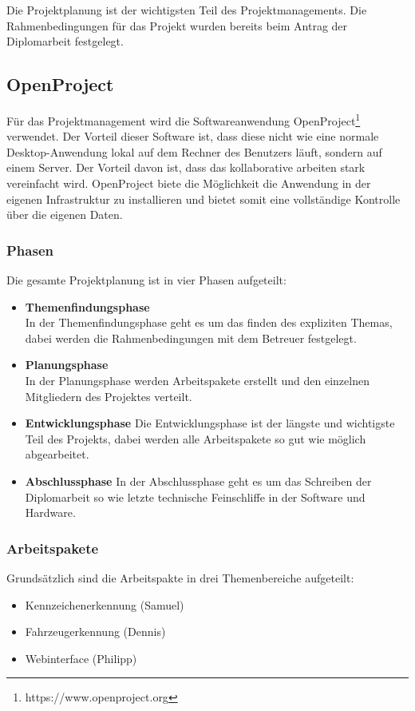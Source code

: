 Die Projektplanung ist der wichtigsten Teil des Projektmanagements. Die
Rahmenbedingungen für das Projekt wurden bereits beim Antrag der Diplomarbeit
festgelegt.

\subsection{OpenProject}
Für das Projektmanagement wird die Softwareanwendung
OpenProject\footnote{https://www.openproject.org} verwendet. Der Vorteil dieser
Software ist, dass diese nicht wie eine normale Desktop-Anwendung lokal auf dem
Rechner des Benutzers läuft, sondern auf einem Server. Der Vorteil davon ist,
dass das kollaborative arbeiten stark vereinfacht wird. OpenProject biete die
Möglichkeit die Anwendung in der eigenen Infrastruktur zu installieren und
bietet somit eine vollständige Kontrolle über die eigenen Daten.

\subsubsection{Phasen}
Die gesamte Projektplanung ist in vier Phasen aufgeteilt:

\begin{itemize}
  \item \textbf{Themenfindungsphase}\\
  In der Themenfindungsphase geht es um das finden des expliziten Themas, dabei
  werden die Rahmenbedingungen mit dem Betreuer festgelegt.
  \item \textbf{Planungsphase}\\
  In der Planungsphase werden Arbeitspakete erstellt und den einzelnen
  Mitgliedern des Projektes verteilt.
  \item \textbf{Entwicklungsphase}
  Die Entwicklungsphase ist der längste und wichtigste Teil des Projekts, dabei
  werden alle Arbeitspakete so gut wie möglich abgearbeitet.
  \item \textbf{Abschlussphase}
  In der Abschlussphase geht es um das Schreiben der Diplomarbeit so wie letzte
  technische Feinschliffe in der Software und Hardware.
\end{itemize}
\subsubsection{Arbeitspakete}
Grundsätzlich sind die Arbeitspakte in drei Themenbereiche aufgeteilt:

\begin{itemize}
  \item Kennzeichenerkennung (Samuel)
  \item Fahrzeugerkennung (Dennis)
  \item Webinterface (Philipp)
\end{itemize}

